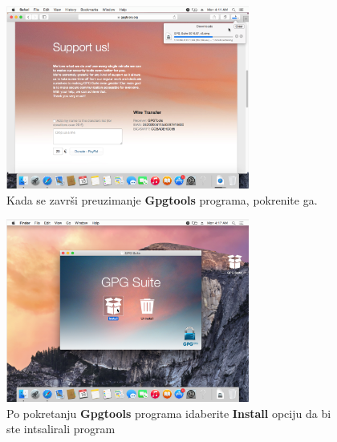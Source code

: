 \documentclass[a4paper,11pt]{article}
\begin{document}
\begin{figure}[!h]
	\begin{center}
		\includegraphics[width=8cm]{02_Oracle_VM_VirtualBox.png}
		\caption{Kada se zavr\v{s}i preuzimanje \textbf{Gpgtools} programa, pokrenite ga.}
		\label{gpgtools_download2}
	\end{center}
\end{figure}
\newpage

\begin{figure}[!h]
	\begin{center}
		\includegraphics[width=8cm]{03_Oracle_VM_VirtualBox.png}
		\caption{Po pokretanju \textbf{Gpgtools} programa idaberite \textbf{Install} opciju da bi ste intsalirali program}
		\label{gpgtools_install1}
	\end{center}
\end{figure}
\end{document}
